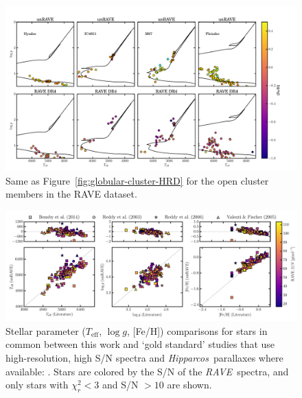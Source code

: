 \documentclass[preprint,trackchanges]{aastex}
\newcommand{\acronym}[1]{{\small{#1}}}
\newcommand{\project}[1]{\textsl{#1}}
\newcommand{\rave}{\project{\acronym{RAVE}}}
\newcommand{\hipparcos}{\project{Hipparcos}}
\newcommand{\teff}{T_{\mathrm{eff}}}
\newcommand{\logg}{\log g}
\begin{document}
\begin{figure}[p]
\includegraphics[width=\textwidth]{figures/HRD_OCs.pdf}
\caption{Same as Figure~\ref{fig:globular-cluster-HRD} for the open cluster members in the RAVE dataset.  \label{fig:open-cluster-HRD}}
\end{figure}

\begin{figure}[p]
\includegraphics[width=\textwidth]{figures/gold-standard-comparison.pdf}
\caption{Stellar parameter ($\teff$, $\logg$, [Fe/H]) comparisons for stars in common between this work and `gold standard' studies that use high-resolution, high S/N spectra and \hipparcos\ parallaxes where available: \citet{Bensby_2014,Reddy_2003,Reddy_2006,Valenti_Fischer_2005}. Stars are colored by the S/N of the \rave\ spectra, and only stars with $\chi_r^2 < 3$ and S/N $> 10$ are shown.  \label{fig:gold-standard-comparison}}
\end{figure}
\end{document}
